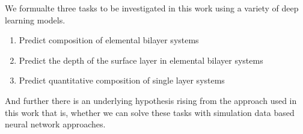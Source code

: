 We formualte three tasks to be investigated in this work using a variety of deep learning models.
\begin{enumerate}
    \item Predict composition of elemental bilayer systems
    \item Predict the depth of the surface layer in elemental bilayer systems 
    \item Predict quantitative composition of single layer systems
\end{enumerate}
And further there is an underlying hypothesis rising from the approach used in this work that is, whether we can solve these tasks with simulation data based neural network approaches.




